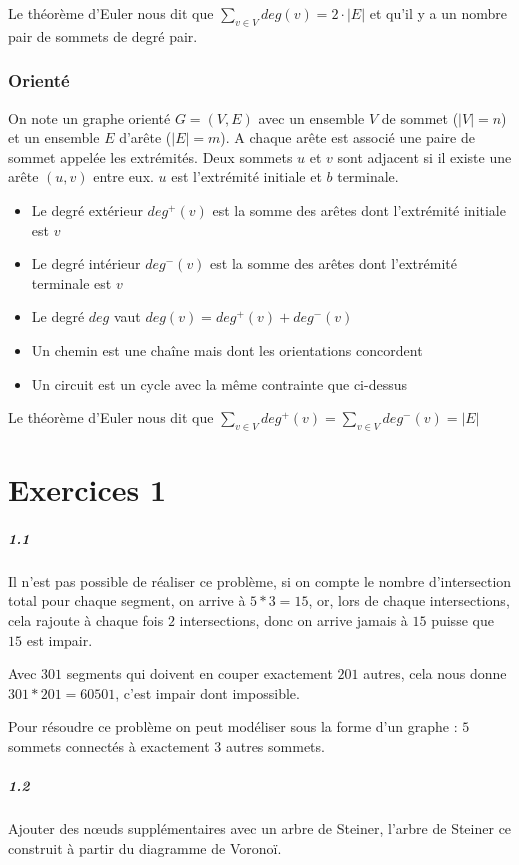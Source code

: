 \documentclass[11pt,a4paper]{report}
\begin{document}
Le théorème d'Euler nous dit que $\sum_{v\in V} deg(v) = 2\cdot |E|$ et qu'il y a un nombre pair de sommets de degré pair.

\subsection{Orienté}
On note un graphe orienté $G=(V,E)$ avec un ensemble $V$ de sommet ($|V|=n$) et un ensemble $E$ d'arête ($|E|=m$). A chaque arête est associé une paire de sommet appelée les extrémités. Deux sommets $u$ et $v$ sont adjacent si il existe une arête $(u,v)$ entre eux. $u$ est l'extrémité initiale et $b$ terminale.

\begin{itemize}
    \item Le degré extérieur $deg^+(v)$ est la somme des arêtes dont l'extrémité initiale est $v$
    \item Le degré intérieur $deg^-(v)$ est la somme des arêtes dont l'extrémité terminale est $v$
    \item Le degré $deg$ vaut $deg(v)=deg^+(v)+deg^-(v)$
    \item Un chemin est une chaîne mais dont les orientations concordent
    \item Un circuit est un cycle avec la même contrainte que ci-dessus
\end{itemize}

Le théorème d'Euler nous dit que $\sum_{v\in V} deg^+(v) = \sum_{v\in V} deg^-(v) = |E|$

\chapter{Exercices 1}
\paragraph*{1.1} Il n'est pas possible de réaliser ce problème, si on compte le nombre d'intersection total pour chaque segment, on arrive à $5*3=15$, or, lors de chaque intersections, cela rajoute à chaque fois $2$ intersections, donc on arrive jamais à $15$ puisse que $15$ est impair.

Avec $301$ segments qui doivent en couper exactement $201$ autres, cela nous donne $301*201=60501$, c'est impair dont impossible.

Pour résoudre ce problème on peut modéliser sous la forme d'un graphe : $5$ sommets connectés à exactement $3$ autres sommets.

\paragraph*{1.2} Ajouter des nœuds supplémentaires avec un arbre de Steiner, l'arbre de Steiner ce construit à partir du diagramme de Voronoï.
\end{document}
